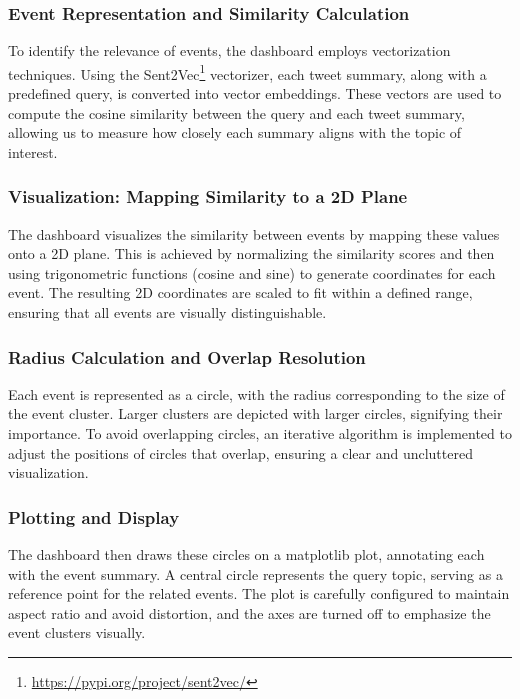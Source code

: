 \subsubsection{Event Representation and Similarity Calculation}  

To identify the relevance of events, the dashboard employs vectorization techniques. Using the Sent2Vec\footnote{\url{https://pypi.org/project/sent2vec/}} vectorizer, each tweet summary, along with a predefined query, is converted into vector embeddings. These vectors are used to compute the cosine similarity between the query and each tweet summary, allowing us to measure how closely each summary aligns with the topic of interest.

\subsubsection{Visualization: Mapping Similarity to a 2D Plane}   

The dashboard visualizes the similarity between events by mapping these values onto a 2D plane. This is achieved by normalizing the similarity scores and then using trigonometric functions (cosine and sine) to generate coordinates for each event. The resulting 2D coordinates are scaled to fit within a defined range, ensuring that all events are visually distinguishable.

\subsubsection {Radius Calculation and Overlap Resolution}

Each event is represented as a circle, with the radius corresponding to the size of the event cluster. Larger clusters are depicted with larger circles, signifying their importance. To avoid overlapping circles, an iterative algorithm is implemented to adjust the positions of circles that overlap, ensuring a clear and uncluttered visualization.

\subsubsection {Plotting and Display}

The dashboard then draws these circles on a matplotlib plot, annotating each with the event summary. A central circle represents the query topic, serving as a reference point for the related events. The plot is carefully configured to maintain aspect ratio and avoid distortion, and the axes are turned off to emphasize the event clusters visually.


